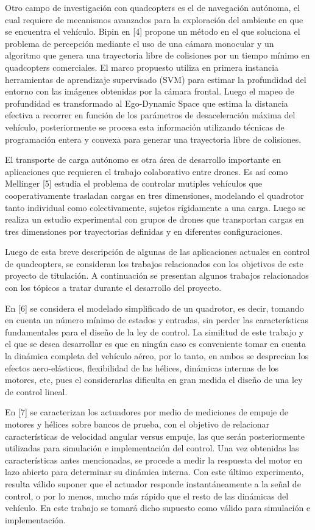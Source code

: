 \documentclass[../main.tex]{subfiles}
\begin{document}
Otro campo de investigación con quadcopters es el de navegación autónoma,
el cual requiere de mecanismos avanzados para la exploración del ambiente
en que se encuentra el vehículo. Bipin en {[}4{]} propone un método
en el que soluciona el problema de percepción mediante el uso de una
cámara monocular y un algoritmo que genera una trayectoria libre de
colisiones por un tiempo mínimo en quadcopters comerciales. El marco
propuesto utiliza en primera instancia herramientas de aprendizaje
supervisado (SVM) para estimar la profundidad del entorno con las
imágenes obtenidas por la cámara frontal. Luego el mapeo de profundidad
es transformado al Ego-Dynamic Space que estima la distancia efectiva
a recorrer en función de los parámetros de desaceleración máxima del
vehículo, posteriormente se procesa esta información utilizando técnicas
de programación entera y convexa para generar una trayectoria libre
de colisiones.

El transporte de carga autónomo es otra área de desarrollo importante
en aplicaciones que requieren el trabajo colaborativo entre drones.
Es así como Mellinger {[}5{]} estudia el problema de controlar mutiples
vehículos que cooperativamente trasladan cargas en tres dimensiones,
modelando el quadrotor tanto individual como colectivamente, sujetos
rígidamente a una carga. Luego se realiza un estudio experimental
con grupos de drones que transportan cargas en tres dimensiones por
trayectorias definidas y en diferentes configuraciones. 

\textcompwordmark{}

Luego de esta breve descripción de algunas de las aplicaciones actuales
en control de quadcopters, se consideran los trabajos relacionados
con los objetivos de este proyecto de titulación. A continuación se
presentan algunos trabajos relacionados con los tópicos a tratar durante
el desarrollo del proyecto.

En {[}6{]} se considera el modelado simplificado de un quadrotor,
es decir, tomando en cuenta un número mínimo de estados y entradas,
sin perder las características fundamentales para el diseño de la
ley de control. La similitud de este trabajo y el que se desea desarrollar
es que en ningún caso es conveniente tomar en cuenta la dinámica completa
del vehículo aéreo, por lo tanto, en ambos se desprecian los efectos
aero-elásticos, flexibilidad de las hélices, dinámicas internas de
los motores, etc, pues el considerarlas dificulta en gran medida el
diseño de una ley de control lineal.

En {[}7{]} se caracterizan los actuadores por medio de mediciones
de empuje de motores y hélices sobre bancos de prueba, con el objetivo
de relacionar características de velocidad angular versus empuje,
las que serán posteriormente utilizadas para simulación e implementación
del control. Una vez obtenidas las características antes mencionadas,
se procede a medir la respuesta del motor en lazo abierto para determinar
su dinámica interna. Con este último experimento, resulta válido suponer
que el actuador responde instantáneamente a la señal de control, o
por lo menos, mucho más rápido que el resto de las dinámicas del vehículo.
En este trabajo se tomará dicho supuesto como válido para simulación
e implementación.
\end{document}
